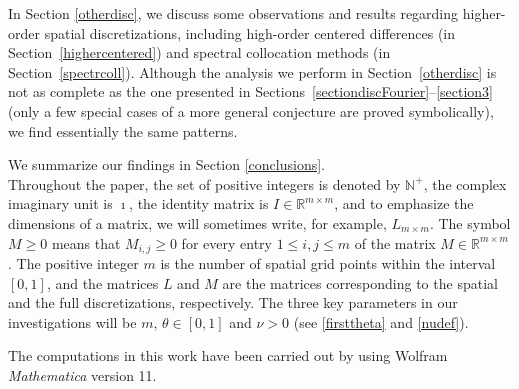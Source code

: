 \documentclass[a4paper]{article}
\newcommand{\dt}{\Delta t}
\newcommand{\dx}{\Delta x}
\newcommand{\nplus}{\mathbb{N}^+}
\newcommand{\rr}{\mathbb{R}}
\begin{document}
In Section \ref{otherdisc}, we discuss some observations and results regarding
higher-order spatial discretizations, including high-order centered differences
(in Section~\ref{highercentered}) and spectral collocation methods (in Section~\ref{spectrcoll}). Although the analysis we perform in Section~\ref{otherdisc} is not as complete as the one presented in Sections~\ref{sectiondiscFourier}--\ref{section3} (only a few special cases of a more general conjecture are proved symbolically), we find essentially the same patterns. 

We summarize our findings in Section \ref{conclusions}.\\


Throughout the paper, the set of positive integers is denoted by $\nplus$, the complex imaginary unit is $\imath$, the identity matrix is $I\in\rr^{m\times m}$, and to emphasize the dimensions of a matrix, we will sometimes write, for example, $L_{m\times m}$.
The symbol $M\ge 0$ means that  $M_{i,j}\ge 0$ for every entry $1\le i, j\le m$ of the matrix $M\in\mathbb{R}^{m\times m}$. The positive integer $m$ is the number of spatial grid points within the interval $[0,1]$, and the matrices $L$ and $M$ are the matrices corresponding to the spatial and the full discretizations, respectively. The three key parameters in our investigations will be $m$, $\theta\in [0,1]$ and $\nu>0$ (see \eqref{firsttheta} and \eqref{nudef}).

The computations in this work have been carried out by using Wolfram \textit{Mathematica} version 11.






\end{document}
